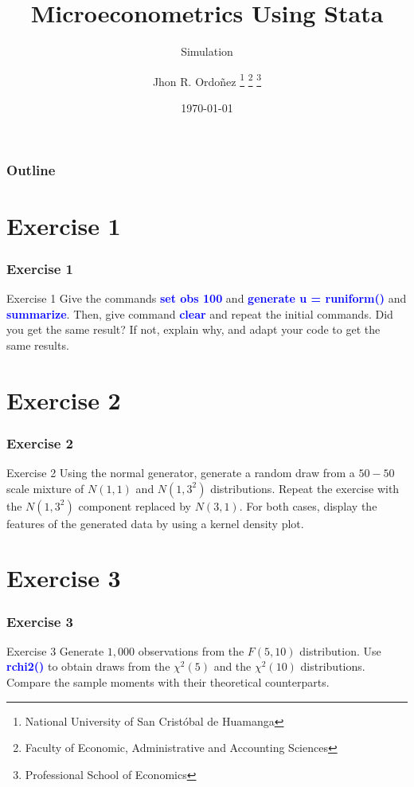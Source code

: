 \documentclass[11pt, aspectratio=169]{beamer}
\title{Microeconometrics Using Stata}
\subtitle{Simulation}
\author{
		Jhon R. Ordoñez
		\footnote{\label{1} National University of San Cristóbal de Huamanga}
		\footnote{\label{2} Faculty of Economic, Administrative and Accounting Sciences}
		\footnote{\label{3} Professional School of Economics}
	}
\date{\today}
\begin{document}
	\begin{frame}
		\maketitle
	\end{frame}
	\begin{frame}[t]
		\frametitle{Outline}
		\tableofcontents
	\end{frame}
	\section{Exercise 1}
		\begin{frame}
			\frametitle{Exercise 1}
				\begin{block}{Exercise 1}
					Give the commands \textcolor{blue}{\textbf{set obs 100}} and \textcolor{blue}{\textbf{generate u = runiform()}} and
					\textcolor{blue}{\textbf{summarize}}. Then, give command \textcolor{blue}{\textbf{clear}} and repeat the initial
					commands. Did you get the same result? If not, explain why, and adapt
					your code to get the same results.
				\end{block}
		\end{frame}
	\section{Exercise 2}
		\begin{frame}
			\frametitle{Exercise 2}
			\begin{block}{Exercise 2}
				Using the normal generator, generate a random draw from a $50-50$
				scale mixture of $N(1,1)$ and $N(1,3^{2})$ distributions. Repeat the
				exercise with the $N(1,3^{2})$ component replaced by $N(3,1)$. For both
				cases, display the features of the generated data by using a kernel
				density plot.
			\end{block}
		\end{frame}
	\section{Exercise 3}
		\begin{frame}
			\frametitle{Exercise 3}
			\begin{block}{Exercise 3}
				Generate $1,000$ observations from the $F(5,10)$ distribution. Use
				\textcolor{blue}{\textbf{rchi2()}} to obtain draws from the $\chi^{2}(5)$ and the $\chi^{2}(10)$ distributions.
				Compare the sample moments with their theoretical counterparts.
			\end{block}
		\end{frame}
\end{document}
